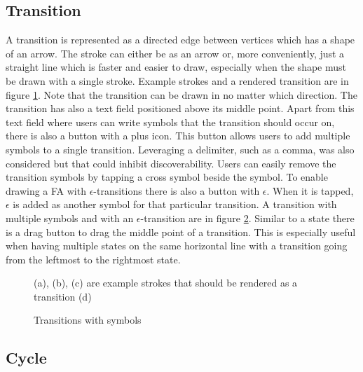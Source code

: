 \subsection{Transition}

A transition is represented as a directed edge between vertices which has a shape of an arrow. The stroke can either be as an arrow or, more conveniently, just a straight line which is faster and easier to draw, especially when the shape must be drawn with a single stroke. Example strokes and a rendered transition are in figure \ref{transition}. Note that the transition can be drawn in no matter which direction. The transition has also a text field positioned above its middle point. Apart from this text field where users can write symbols that the transition should occur on, there is also a button with a plus icon. This button allows users to add multiple symbols to a single transition. Leveraging a delimiter, such as a comma, was also considered but that could inhibit discoverability. Users can easily remove the transition symbols by tapping a cross symbol beside the symbol. To enable drawing a FA with $\epsilon$-transitions there is also a button with $\epsilon$. When it is tapped, $\epsilon$ is added as another symbol for that particular transition. A transition with multiple symbols and with an $\epsilon$-transition are in figure \ref{transition-symbols}. Similar to a state there is a drag button to drag the middle point of a transition. This is especially useful when having multiple states on the same horizontal line with a transition going from the leftmost to the rightmost state.

\begin{figure}
    \centering
    \caption{(a), (b), (c) are example strokes that should be rendered as a transition (d)}\label{transition}
\end{figure}

\begin{figure}
    \centering
    \caption{Transitions with symbols}\label{transition-symbols}
\end{figure}

\subsection{Cycle}

